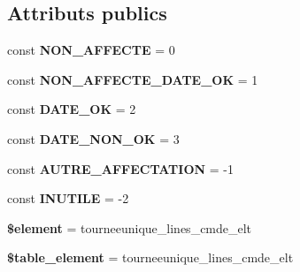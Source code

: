 \subsection*{Attributs publics}
\begin{DoxyCompactItemize}
\item 
\mbox{\label{classTourneeUnique__lines__cmde__elt_ab0415a079e51f2844542c65b26d65790}} 
const {\bfseries N\+O\+N\+\_\+\+A\+F\+F\+E\+C\+TE} = 0
\item 
\mbox{\label{classTourneeUnique__lines__cmde__elt_abe62f7867095d2699035e0ab91a86cee}} 
const {\bfseries N\+O\+N\+\_\+\+A\+F\+F\+E\+C\+T\+E\+\_\+\+D\+A\+T\+E\+\_\+\+OK} = 1
\item 
\mbox{\label{classTourneeUnique__lines__cmde__elt_ab9779da9145c00d024f131a9ee657fa7}} 
const {\bfseries D\+A\+T\+E\+\_\+\+OK} = 2
\item 
\mbox{\label{classTourneeUnique__lines__cmde__elt_a0622d1940eb980ca74f99800616cc492}} 
const {\bfseries D\+A\+T\+E\+\_\+\+N\+O\+N\+\_\+\+OK} = 3
\item 
\mbox{\label{classTourneeUnique__lines__cmde__elt_a4c80abd9569fdd275fb5902c2575114a}} 
const {\bfseries A\+U\+T\+R\+E\+\_\+\+A\+F\+F\+E\+C\+T\+A\+T\+I\+ON} = -\/1
\item 
\mbox{\label{classTourneeUnique__lines__cmde__elt_ae884769d8915d81bca4874328dcea277}} 
const {\bfseries I\+N\+U\+T\+I\+LE} = -\/2
\item 
\mbox{\label{classTourneeUnique__lines__cmde__elt_aa03593640cd3a8bf0414542d4771aa88}} 
{\bfseries \$element} = \textquotesingle{}tourneeunique\+\_\+lines\+\_\+cmde\+\_\+elt\textquotesingle{}
\item 
\mbox{\label{classTourneeUnique__lines__cmde__elt_a41f7246d4df8ccc6e6dbfa237a3f53ea}} 
{\bfseries \$table\+\_\+element} = \textquotesingle{}tourneeunique\+\_\+lines\+\_\+cmde\+\_\+elt\textquotesingle{}
\item 

\end{DoxyCompactItemize}

